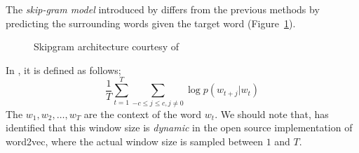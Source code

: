 The \emph{skip-gram model} introduced by \textcite{mikolov_efficient_2013} differs from the previous methods by predicting the surrounding words given the target word (Figure~\ref{fig:skipgram}).
\begin{figure}[htbp]
    \centering
    \caption{Skipgram architecture courtesy of \textcite{mikolov_distributed_2013}}%
    \label{fig:skipgram}
\end{figure}
In , it is defined as follows;
\begin{equation}
    \frac{1}{T}\sum_{t=1}^{T}\sum_{-c \leq j \leq c, j \neq 0} \log p(w_{t+j}|w_t)
\end{equation}
The $w_{1}, w_{2}, \dots, w_{T}$ are the context of the word $w_t$.
We should note that, \textcite{levy_improving_2015} has identified that this window size is \emph{dynamic} in the open source implementation of word2vec, where the actual window size is sampled between $1$ and $T$.



